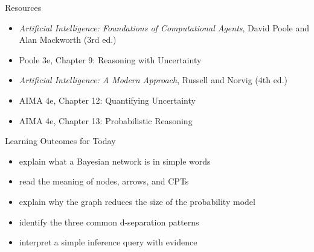 \documentclass[aspectratio=169]{beamer}
\begin{document}
\begin{frame}{Resources}
\small
\begin{itemize}
  \item \textit{Artificial Intelligence: Foundations of Computational Agents}, David Poole and Alan Mackworth (3rd ed.)
  \item Poole 3e, Chapter 9: Reasoning with Uncertainty
  \item \textit{Artificial Intelligence: A Modern Approach}, Russell and Norvig (4th ed.)
  \item AIMA 4e, Chapter 12: Quantifying Uncertainty
  \item AIMA 4e, Chapter 13: Probabilistic Reasoning
\end{itemize}
\end{frame}

\begin{frame}{Learning Outcomes for Today}
\begin{itemize}
  \item explain what a Bayesian network is in simple words
  \item read the meaning of nodes, arrows, and CPTs
  \item explain why the graph reduces the size of the probability model
  \item identify the three common d-separation patterns
  \item interpret a simple inference query with evidence
\end{itemize}
\end{frame}
\end{document}
